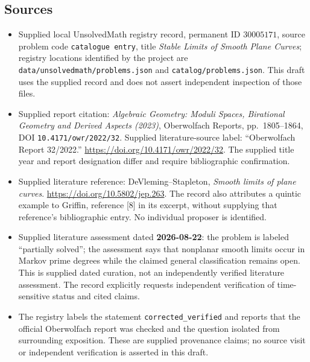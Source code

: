 \documentclass[11pt]{article}
\begin{document}
\subsection{Sources}
\begin{itemize}
\item Supplied local UnsolvedMath registry record, permanent ID \(30005171\), source problem code \texttt{catalogue entry}, title \emph{Stable Limits of Smooth Plane Curves}; registry locations identified by the project are \texttt{data/unsolvedmath/problems.json} and \texttt{catalog/problems.json}. This draft uses the supplied record and does not assert independent inspection of those files.
\item Supplied report citation: \emph{Algebraic Geometry: Moduli Spaces, Birational Geometry and Derived Aspects (2023)}, Oberwolfach Reports, pp.\ 1805--1864, DOI \texttt{10.4171/owr/2022/32}. Supplied literature-source label: ``Oberwolfach Report 32/2022.'' \url{https://doi.org/10.4171/owr/2022/32}. The supplied title year and report designation differ and require bibliographic confirmation.
\item Supplied literature reference: DeVleming--Stapleton, \emph{Smooth limits of plane curves}. \url{https://doi.org/10.5802/jep.263}. The record also attributes a quintic example to Griffin, reference [8] in its excerpt, without supplying that reference's bibliographic entry. No individual proposer is identified.
\item Supplied literature assessment dated \textbf{2026-08-22}: the problem is labeled ``partially solved''; the assessment says that nonplanar smooth limits occur in Markov prime degrees while the claimed general classification remains open. This is supplied dated curation, not an independently verified literature assessment. The record explicitly requests independent verification of time-sensitive status and cited claims.
\item The registry labels the statement \texttt{corrected\_verified} and reports that the official Oberwolfach report was checked and the question isolated from surrounding exposition. These are supplied provenance claims; no source visit or independent verification is asserted in this draft.
\end{itemize}
\end{document}
